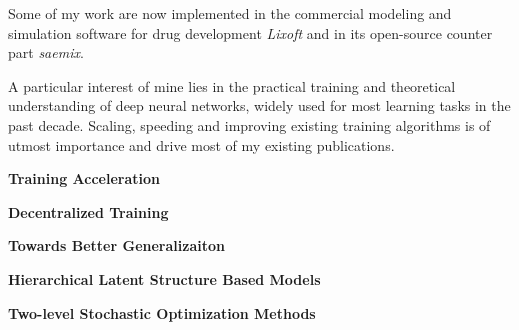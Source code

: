 \documentclass[twoside,11pt]{article}
\begin{document}
Some of my work are now implemented in the commercial modeling and simulation software for drug development \emph{Lixoft} and in its open-source counter part \emph{saemix}.


\vspace{0.2in}


\textbf{}
\vspace{0.2in}

A particular interest of mine lies in the practical training and theoretical understanding of deep neural networks, widely used for most learning tasks in the past decade.
Scaling, speeding and improving existing training algorithms is of utmost importance and drive most of my existing publications.


\vspace{0.15in}
\textbf{Training Acceleration} 
\vspace{0.08in}

\lipsum[35]


\vspace{0.15in}
\textbf{Decentralized Training} 
\vspace{0.08in}

\lipsum[35]

\vspace{0.15in}
\textbf{Towards Better Generalizaiton} 
\vspace{0.08in}

\lipsum[35]

\clearpage



\textbf{}
\vspace{0.2in}

\lipsum[35]

\vspace{0.15in}
\textbf{Hierarchical Latent Structure Based Models} 
\vspace{0.08in}

\lipsum[35]


\vspace{0.15in}
\textbf{Two-level Stochastic Optimization Methods} 
\vspace{0.08in}
\end{document}
